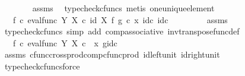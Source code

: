 \begin{isabellebody}
\ \ \ \ \ \ \isamarkupfalse%
\ assms\ \isamarkupfalse%
\ {\isacharparenleft}{\kern0pt}typecheck{\isacharunderscore}{\kern0pt}cfuncs{\isacharcomma}{\kern0pt}\ metis\ one{\isacharunderscore}{\kern0pt}unique{\isacharunderscore}{\kern0pt}element{\isacharparenright}{\kern0pt}\isanewline
\ \ \ \ \isamarkupfalse%
\ \isamarkupfalse%
\ {\isachardoublequoteopen}{\isachardot}{\kern0pt}{\isachardot}{\kern0pt}{\isachardot}{\kern0pt}\ {\isacharequal}{\kern0pt}\ f\isactrlsup {\isasymflat}\ {\isasymcirc}\isactrlsub c\ {\isasymlangle}{\isacharparenleft}{\kern0pt}eval{\isacharunderscore}{\kern0pt}func\ Y\ X{\isacharparenright}{\kern0pt}\ {\isasymcirc}\isactrlsub c\ {\isacharparenleft}{\kern0pt}id\ X\ {\isasymtimes}\isactrlsub f\ g{\isacharparenright}{\kern0pt}\ {\isasymcirc}\isactrlsub c\ {\isasymlangle}x{\isacharcomma}{\kern0pt}\ id\isactrlsub c\ {\isasymone}{\isasymrangle}{\isacharcomma}{\kern0pt}id\isactrlsub c\ {\isasymone}{\isasymrangle}{\isachardoublequoteclose}\isanewline
\ \ \ \ \ \ \isamarkupfalse%
\ assms\ \isamarkupfalse%
\ {\isacharparenleft}{\kern0pt}typecheck{\isacharunderscore}{\kern0pt}cfuncs{\isacharcomma}{\kern0pt}\ simp\ add{\isacharcolon}{\kern0pt}\ comp{\isacharunderscore}{\kern0pt}associative{}\ inv{\isacharunderscore}{\kern0pt}transpose{\isacharunderscore}{\kern0pt}func{\isacharunderscore}{\kern0pt}def{}{\isacharparenright}{\kern0pt}\isanewline
\ \ \ \ \isamarkupfalse%
\ \isamarkupfalse%
\ {\isachardoublequoteopen}{\isachardot}{\kern0pt}{\isachardot}{\kern0pt}{\isachardot}{\kern0pt}\ {\isacharequal}{\kern0pt}\ f\isactrlsup {\isasymflat}\ {\isasymcirc}\isactrlsub c\ {\isasymlangle}{\isacharparenleft}{\kern0pt}eval{\isacharunderscore}{\kern0pt}func\ Y\ X{\isacharparenright}{\kern0pt}\ {\isasymcirc}\isactrlsub c\ \ {\isasymlangle}x{\isacharcomma}{\kern0pt}\ g{\isasymrangle}{\isacharcomma}{\kern0pt}id\isactrlsub c\ {\isasymone}{\isasymrangle}{\isachardoublequoteclose}\isanewline
\ \ \ \ \ \ \isamarkupfalse%
\ assms\ cfunc{\isacharunderscore}{\kern0pt}cross{\isacharunderscore}{\kern0pt}prod{\isacharunderscore}{\kern0pt}comp{\isacharunderscore}{\kern0pt}cfunc{\isacharunderscore}{\kern0pt}prod\ id{\isacharunderscore}{\kern0pt}left{\isacharunderscore}{\kern0pt}unit{}\ id{\isacharunderscore}{\kern0pt}right{\isacharunderscore}{\kern0pt}unit{}\ \isamarkupfalse%
\ {\isacharparenleft}{\kern0pt}typecheck{\isacharunderscore}{\kern0pt}cfuncs{\isacharcomma}{\kern0pt}force{\isacharparenright}{\kern0pt}\isanewline

\end{isabellebody}
